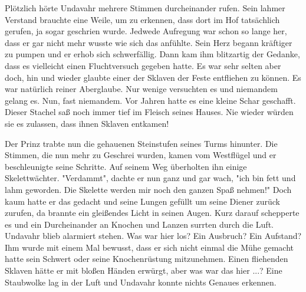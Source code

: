\documentclass[10pt, a4paper, oneside]{book}
\begin{document}
\begin{multicols}{2}
Plötzlich hörte Undavahr mehrere Stimmen durcheinander rufen. Sein lahmer Verstand brauchte eine Weile, um zu erkennen, dass dort im Hof tatsächlich gerufen, ja sogar geschrien wurde. Jedwede Aufregung war schon so lange her, dass er gar nicht mehr wusste wie sich das anfühlte. Sein Herz begann kräftiger zu pumpen und er erhob sich schwerfällig. Dann kam ihm blitzartig der Gedanke, dass es vielleicht einen Fluchtversuch gegeben hatte. Es war sehr selten aber doch, hin und wieder glaubte einer der Sklaven der Feste entfliehen zu können. Es war natürlich reiner Aberglaube. Nur wenige versuchten es und niemandem gelang es. Nun, fast niemandem. Vor Jahren hatte es eine kleine Schar geschafft. Dieser Stachel saß noch immer tief im Fleisch seines Hauses. Nie wieder würden sie es zulassen, dass ihnen Sklaven entkamen!\bigskip

Der Prinz trabte nun die gehauenen Steinstufen seines Turms hinunter. Die Stimmen, die nun mehr zu Geschrei wurden, kamen vom Westflügel und er beschleunigte seine Schritte. Auf seinem Weg überholten ihn einige Skelettwächter. "Verdammt", dachte er nun ganz und gar wach, "ich bin fett und lahm geworden. Die Skelette werden mir noch den ganzen Spaß nehmen!" Doch kaum hatte er das gedacht und seine Lungen gefüllt um seine Diener zurück zurufen, da brannte ein gleißendes Licht in seinen Augen. Kurz darauf schepperte es und ein Durcheinander an Knochen und Lanzen surrten durch die Luft. Undavahr blieb alarmiert stehen. Was war hier los? Ein Ausbruch? Ein Aufstand? Ihm wurde mit einem Mal bewusst, dass er sich nicht einmal die Mühe gemacht hatte sein Schwert oder seine Knochenrüstung mitzunehmen. Einen fliehenden Sklaven hätte er mit bloßen Händen erwürgt, aber was war das hier ...? Eine Staubwolke lag in der Luft und Undavahr konnte nichts Genaues erkennen.


\end{multicols}
\end{document}
